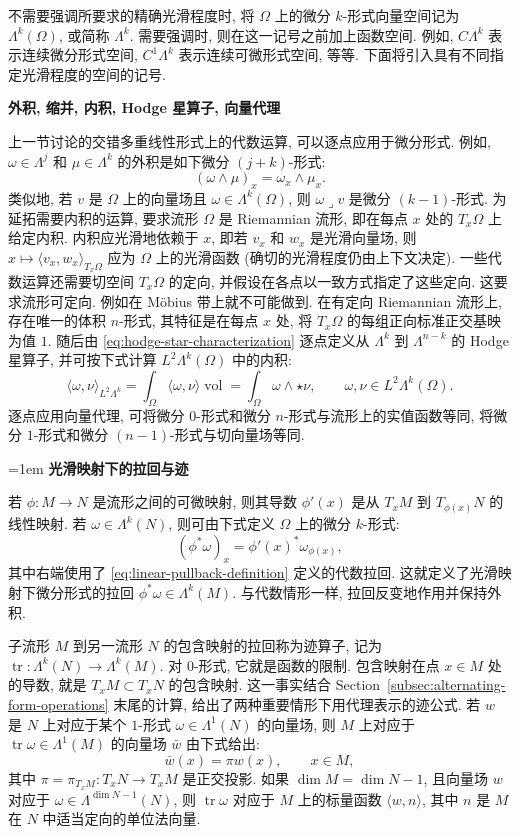不需要强调所要求的精确光滑程度时, 将 $\Omega$ 上的微分 $k$-形式向量空间记为 $\Lambda^k(\Omega)$, 或简称 $\Lambda^k$. 需要强调时, 则在这一记号之前加上函数空间. 例如, $C\Lambda^k$ 表示连续微分形式空间, $C^1\Lambda^k$ 表示连续可微形式空间, 等等. 下面将引入具有不同指定光滑程度的空间的记号.

\medskip\noindent\textbf{{外积, 缩并, 内积, Hodge 星算子, 向量代理}}\par
上一节讨论的交错多重线性形式上的代数运算, 可以逐点应用于微分形式. 例如, $\omega\in\Lambda^j$ 和 $\mu\in\Lambda^k$ 的外积是如下微分 $(j+k)$-形式:
\[
(\omega\wedge\mu)_x=\omega_x\wedge\mu_x.
\]
类似地, 若 $v$ 是 $\Omega$ 上的向量场且 $\omega\in\Lambda^k(\Omega)$, 则 $\omega\lrcorner v$ 是微分 $(k-1)$-形式. 为延拓需要内积的运算, 要求流形 $\Omega$ 是 Riemannian 流形, 即在每点 $x$ 处的 $T_x\Omega$ 上给定内积. 内积应光滑地依赖于 $x$, 即若 $v_x$ 和 $w_x$ 是光滑向量场, 则 $x\mapsto\langle v_x,w_x\rangle_{T_x\Omega}$ 应为 $\Omega$ 上的光滑函数 (确切的光滑程度仍由上下文决定). 一些代数运算还需要切空间 $T_x\Omega$ 的定向, 并假设在各点以一致方式指定了这些定向. 这要求流形可定向. 例如在 Möbius 带上就不可能做到. 在有定向 Riemannian 流形上, 存在唯一的体积 $n$-形式, 其特征是在每点 $x$ 处, 将 $T_x\Omega$ 的每组正向标准正交基映为值 $1$. 随后由 \eqref{eq:hodge-star-characterization} 逐点定义从 $\Lambda^k$ 到 $\Lambda^{n-k}$ 的 Hodge 星算子, 并可按下式计算 $L^2\Lambda^k(\Omega)$ 中的内积:
\[
\langle\omega,\nu\rangle_{L^2\Lambda^k}=\int_\Omega\langle\omega,\nu\rangle\operatorname{vol}=\int_\Omega\omega\wedge\star\nu,\qquad\omega,\nu\in L^2\Lambda^k(\Omega).
\]
逐点应用向量代理, 可将微分 $0$-形式和微分 $n$-形式与流形上的实值函数等同, 将微分 $1$-形式和微分 $(n-1)$-形式与切向量场等同.

\begingroup\emergencystretch=1em
\medskip\noindent\textbf{{光滑映射下的拉回与迹}}\par
若 $\phi:M\to N$ 是流形之间的可微映射, 则其导数 $\phi'(x)$ 是从 $T_xM$ 到 $T_{\phi(x)}N$ 的线性映射. 若 $\omega\in\Lambda^k(N)$, 则可由下式定义 $\Omega$ 上的微分 $k$-形式:
\begin{equation}\label{eq:smooth-pullback-definition}
(\phi^*\omega)_x=\phi'(x)^*\omega_{\phi(x)},
\end{equation}
其中右端使用了 \eqref{eq:linear-pullback-definition} 定义的代数拉回. 这就定义了光滑映射下微分形式的拉回 $\phi^*\omega\in\Lambda^k(M)$. 与代数情形一样, 拉回反变地作用并保持外积.

\par\endgroup
子流形 $M$ 到另一流形 $N$ 的包含映射的拉回称为迹算子, 记为 $\operatorname{tr}:\Lambda^k(N)\to\Lambda^k(M)$. 对 $0$-形式, 它就是函数的限制. 包含映射在点 $x\in M$ 处的导数, 就是 $T_xM\subset T_xN$ 的包含映射. 这一事实结合 Section~\ref{subsec:alternating-form-operations} 末尾的计算, 给出了两种重要情形下用代理表示的迹公式. 若 $w$ 是 $N$ 上对应于某个 $1$-形式 $\omega\in\Lambda^1(N)$ 的向量场, 则 $M$ 上对应于 $\operatorname{tr}\omega\in\Lambda^1(M)$ 的向量场 $\bar w$ 由下式给出:
\[
\bar w(x)=\pi w(x),\qquad x\in M,
\]
其中 $\pi=\pi_{T_xM}:T_xN\to T_xM$ 是正交投影. 如果 $\dim M=\dim N-1$, 且向量场 $w$ 对应于 $\omega\in\Lambda^{\dim N-1}(N)$, 则 $\operatorname{tr}\omega$ 对应于 $M$ 上的标量函数 $\langle w,n\rangle$, 其中 $n$ 是 $M$ 在 $N$ 中适当定向的单位法向量.

